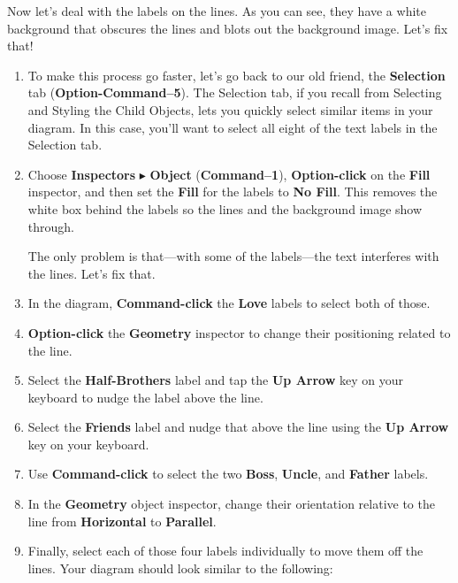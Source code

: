 \documentclass[../main.tex]{subfiles}
\begin{document}
Now let's deal with the labels on the lines. As you can see, they have a white background that
obscures the lines and blots out the background image. Let's fix that!

\begin{enumerate}
  \item To make this process go faster, let's go back to our old friend, the \textbf{Selection}
    tab (\textbf{Option-Command--5}). The Selection tab, if you recall from Selecting and
    Styling the Child Objects, lets you quickly select similar items in your diagram. In this
    case, you'll want to select all eight of the text labels in the Selection tab.

  \item Choose \textbf{Inspectors} $\blacktriangleright$ \textbf{Object} (\textbf{Command--1}),
    \textbf{Option-click} on the \textbf{Fill} inspector, and then set the \textbf{Fill} for the
    labels to \textbf{No Fill}. This removes the white box behind the labels so the lines and
    the background image show through.


    The only problem is that---with some of the labels---the text interferes with the lines. Let's
    fix that.
  \item In the diagram, \textbf{Command-click} the \textbf{Love} labels to select both of those.
  \item \textbf{Option-click} the \textbf{Geometry} inspector to change their positioning
    related to the line.

  \item Select the \textbf{Half-Brothers} label and tap the \textbf{Up Arrow} key on your
    keyboard to nudge the label above the line.
  \item Select the \textbf{Friends} label and nudge that above the line using the \textbf{Up
    Arrow} key on your keyboard.
  \item Use \textbf{Command-click} to select the two \textbf{Boss}, \textbf{Uncle}, and
    \textbf{Father} labels.
  \item In the \textbf{Geometry} object inspector, change their orientation relative to the line
    from \textbf{Horizontal} to \textbf{Parallel}.

  \item Finally, select each of those four labels individually to move them off the lines. Your
    diagram should look similar to the following:

\end{enumerate}
\end{document}
